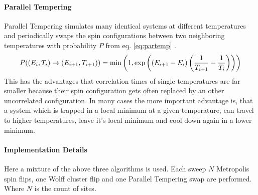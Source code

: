     \paragraph{Parallel Tempering}
        Parallel Tempering simulates many identical systems at different
        temperatures and periodically swaps the spin configurations
        between two neighboring temperatures with probability \(P\) from
        eq. \eqref{eq:partemp} \cite[S. ??]{NewmanBarkema1999} \cite[S. 155ff]{Katzgraber2011}.
        \begin{equation}
            P((E_i,T_i) \to (E_{i+1},T_{i+1})) = \min\left(1,\exp\left(\left(E_{i+1}-E_i\right)\left(\frac{1}{T_{i+1}}-\frac{1}{T_i}\right)\right)\right)
            \label{eq:partemp}
        \end{equation}
        This has the advantages that correlation times of single
        temperatures are far smaller because their spin configuration
        gets often replaced by an other uncorrelated configuration. In
        many cases the more important advantage is, that a system which
        is trapped in a local minimum at a given temperature, can travel
        to higher temperatures, leave it's local minimum and cool down
        again in a lower minimum.

    \paragraph{Implementation Details}
        Here a mixture of the above three algorithms is used.
        Each sweep \(N\) Metropolis spin flips, one Wolff cluster flip
        and one Parallel Tempering swap are performed. Where \(N\) is the
        count of sites.

